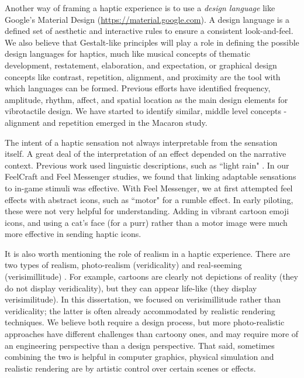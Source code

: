 Another way of framing a haptic experience is to use a \emph{design language} like Google's Material Design (\url{https://material.google.com}).
A design language is a defined set of aesthetic and interactive rules to ensure a consistent look-and-feel.
We also believe that Gestalt-like principles will play a role in defining the possible design languages for haptics,
much like musical concepts of thematic development, restatement, elaboration, and expectation, or graphical design concepts like contrast, repetition, alignment, and proximity are the tool with which languages can be formed.
Previous efforts have identified frequency, amplitude, rhythm, affect, and spatial location as the main design elements for vibrotactile design.
We have started to identify similar, middle level concepts - alignment and repetition emerged in the Macaron study.


The intent of a haptic sensation  not always interpretable from the sensation itself.
A great deal of the interpretation of an effect depended on the narrative context.
Previous work used linguistic descriptions, such as ``light rain" \cite{Israr2014}.
In our FeelCraft and Feel Messenger studies, we found that linking adaptable sensations to in-game stimuli was effective.
With Feel Messenger, we at first attempted feel effects with abstract icons, such as ``motor" for a rumble effect. 
In early piloting, these were not very helpful for understanding.
Adding in vibrant cartoon emoji icons, and using  a cat's face (for a purr) rather than a motor image were much more effective in sending haptic icons.

It is also worth mentioning the role of realism in a haptic experience.
There are two types of realism, photo-realism (veridicality) and real-seeming (verisimillitude) \cite{mccloud1993understanding}.
For example, cartoons are clearly not depictions of reality (they do not display veridicality), but they can appear life-like (they display verisimilitude).
In this dissertation, we focused on verisimillitude rather than veridicality; the latter is often already accommodated by realistic rendering techniques.
We believe both require a design process, but more photo-realistic approaches have different challenges than cartoony ones, and may require more of an engineering perspective than a design perspective.
That said, sometimes combining the two is helpful\osE{:} in computer graphics, physical simulation and realistic rendering are  by artistic control over certain scenes or effects.







